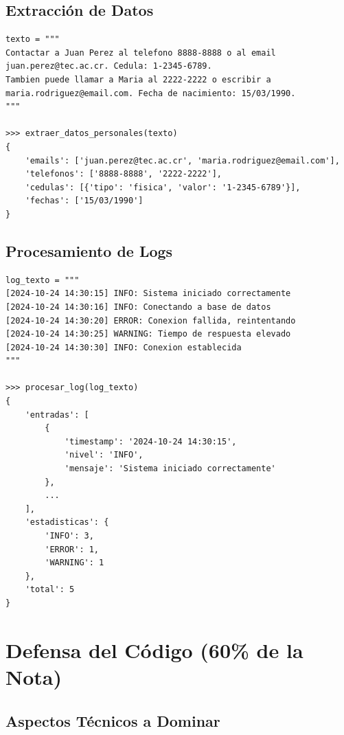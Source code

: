 \documentclass[11pt,letterpaper]{article}
\begin{document}
\subsection{Extracción de Datos}

\begin{lstlisting}[caption={Ejemplo de extracción de datos personales}]
texto = """
Contactar a Juan Perez al telefono 8888-8888 o al email 
juan.perez@tec.ac.cr. Cedula: 1-2345-6789.
Tambien puede llamar a Maria al 2222-2222 o escribir a 
maria.rodriguez@email.com. Fecha de nacimiento: 15/03/1990.
"""

>>> extraer_datos_personales(texto)
{
    'emails': ['juan.perez@tec.ac.cr', 'maria.rodriguez@email.com'],
    'telefonos': ['8888-8888', '2222-2222'],
    'cedulas': [{'tipo': 'fisica', 'valor': '1-2345-6789'}],
    'fechas': ['15/03/1990']
}
\end{lstlisting}

\subsection{Procesamiento de Logs}

\begin{lstlisting}[caption={Ejemplo de procesamiento de logs}]
log_texto = """
[2024-10-24 14:30:15] INFO: Sistema iniciado correctamente
[2024-10-24 14:30:16] INFO: Conectando a base de datos
[2024-10-24 14:30:20] ERROR: Conexion fallida, reintentando
[2024-10-24 14:30:25] WARNING: Tiempo de respuesta elevado
[2024-10-24 14:30:30] INFO: Conexion establecida
"""

>>> procesar_log(log_texto)
{
    'entradas': [
        {
            'timestamp': '2024-10-24 14:30:15',
            'nivel': 'INFO',
            'mensaje': 'Sistema iniciado correctamente'
        },
        ...
    ],
    'estadisticas': {
        'INFO': 3,
        'ERROR': 1,
        'WARNING': 1
    },
    'total': 5
}
\end{lstlisting}

\section{Defensa del Código (60\% de la Nota)}

\subsection{Aspectos Técnicos a Dominar}
\end{document}
